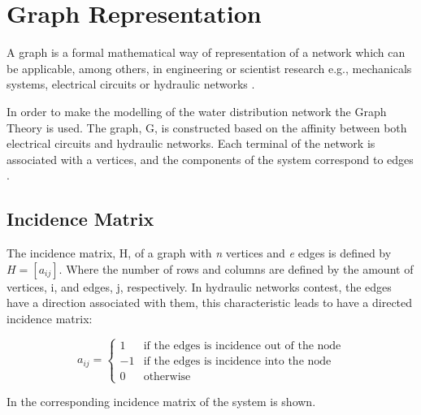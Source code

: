 \section{Graph Representation}  
\label{GraphTheory}
A graph is a formal mathematical way of representation of a network which can be applicable, among others, 
in engineering or scientist research e.g., mechanicals systems, electrical circuits or hydraulic networks \cite{graph_intro}. 

In order to make the modelling of the water distribution network the Graph Theory is used. The graph, G, is constructed 
based on the affinity between both electrical circuits and hydraulic networks. 
Each terminal of the network is associated with a vertices, and the components of the system correspond to edges \cite{GraphTheoryCarsten}. 
\subsection{Incidence Matrix} 

The incidence matrix, H, of a graph with \textit{n} vertices and \textit{e} edges is 
defined by $H = [a_{ij}]$. Where the number of rows and columns are defined by the amount of vertices, i, and edges, j, respectively.
In hydraulic networks contest, the edges have a direction associated with them, this characteristic leads to have a directed incidence matrix:

\begin{equation}
\label{DiGraph}
 a_{ij} =
		\left\{
		\begin{array}{ll}
		
		1 			&      \text{if the edges is incidence out of the node}	
\\
		-1                       &     \text{if the edges is incidence into the node}
\\

                0                       &      \text{otherwise}

		\end{array}
		\right.
\end{equation}	

In  the corresponding incidence matrix of the system is 
shown. %

